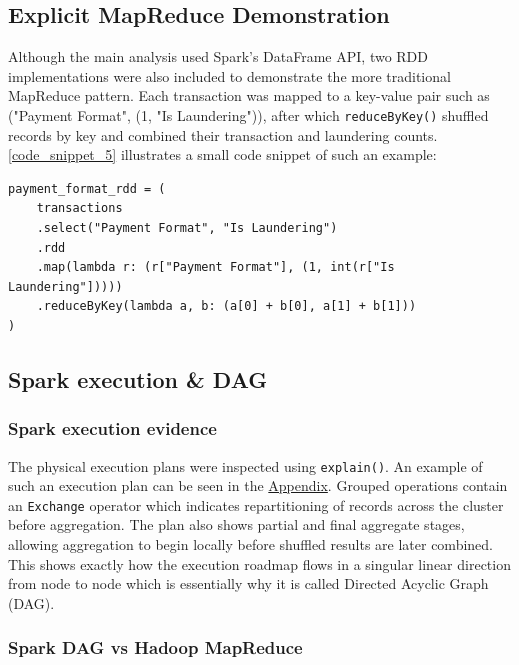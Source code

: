 \subsection{Explicit MapReduce Demonstration}

Although the main analysis used Spark's DataFrame API, two RDD implementations were also included to demonstrate the more traditional MapReduce pattern.  Each transaction was mapped to a key-value pair such as ("Payment Format", (1, "Is Laundering")), after which \texttt{reduceByKey()} shuffled records by key and combined their transaction and laundering counts. \autoref{code_snippet_5} illustrates a small code snippet of such an example:

\begin{lstlisting}[caption={PySpark RDD Example}, label={code_snippet_5}]
payment_format_rdd = (
    transactions
    .select("Payment Format", "Is Laundering")
    .rdd
    .map(lambda r: (r["Payment Format"], (1, int(r["Is Laundering"]))))
    .reduceByKey(lambda a, b: (a[0] + b[0], a[1] + b[1]))
)
\end{lstlisting}

\subsection{Spark execution \& DAG}

\subsubsection{Spark execution evidence}

The physical execution plans were inspected using \texttt{explain()}. An example of such an execution plan can be seen in the \hyperref[app:appendix]{Appendix}. Grouped operations contain an \texttt{Exchange} operator which indicates repartitioning of records across the cluster before aggregation. The plan also shows partial and final aggregate stages, allowing aggregation to begin locally before shuffled results are later combined. This shows exactly how the execution roadmap flows in a singular linear direction from node to node which is essentially why it is called Directed Acyclic Graph (DAG).

\subsubsection{Spark DAG vs Hadoop MapReduce}

